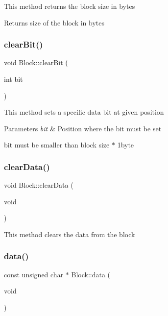 This method returns the block size in bytes

\begin{DoxyReturn}{Returns}
size of the block in bytes 
\end{DoxyReturn}
\mbox{\label{classcore_1_1logic_1_1_block_aaf20f779418e0491c626e009f1e66bb9}} 
\subsubsection{\texorpdfstring{clear\+Bit()}{clearBit()}}
{\footnotesize\ttfamily void Block\+::clear\+Bit (\begin{DoxyParamCaption}\item[{int}]{bit }\end{DoxyParamCaption})}

This method sets a specific data bit at given position


\begin{DoxyParams}{Parameters}
{\em bit} & Position where the bit must be set\\
\hline
\end{DoxyParams}
bit must be smaller than block size $\ast$ 1byte \mbox{\label{classcore_1_1logic_1_1_block_aa63e9635221bda7c6660a5c254510e78}} 
\subsubsection{\texorpdfstring{clear\+Data()}{clearData()}}
{\footnotesize\ttfamily void Block\+::clear\+Data (\begin{DoxyParamCaption}\item[{void}]{ }\end{DoxyParamCaption})}

This method clears the data from the block \mbox{\label{classcore_1_1logic_1_1_block_a2c8b08fd7d36f82b34b7d89268f2da4f}} 
\subsubsection{\texorpdfstring{data()}{data()}}
{\footnotesize\ttfamily const unsigned char $\ast$ Block\+::data (\begin{DoxyParamCaption}\item[{void}]{ }\end{DoxyParamCaption})}

